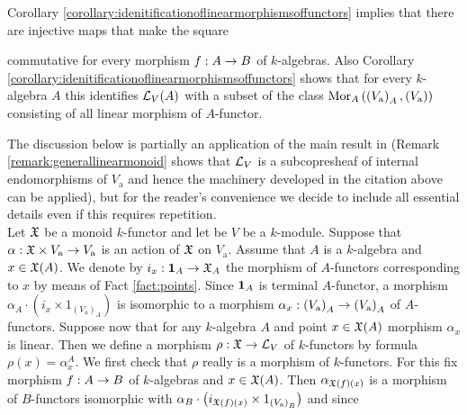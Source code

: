 \begin{remark}\label{remark:generallinearmonoid}
Corollary \ref{corollary:idenitificationoflinearmorphismsoffunctors} implies that there are injective maps that make the square
\begin{center}
\end{center}
commutative for every morphism $f:A\rightarrow B$ of $k$-algebras. Also Corollary \ref{corollary:idenitificationoflinearmorphismsoffunctors} shows that for every $k$-algebra $A$ this identifies ${\mathcal L}_V(A)$ with a subset of the class $\mathrm{Mor}_A\left(\left(V_{\mathrm{a}}\right)_A,\left(V_{\mathrm{a}}\right)\right)$ consisting of all linear morphism of $A$-functor.
\end{remark}
\noindent
The discussion below is partially an application of the main result in {\cite[section 6]{Presheaves}} (Remark \ref{remark:generallinearmonoid} shows that ${\mathcal L}_V$ is a subcopresheaf of internal endomorphisms of $V_{\mathrm{a}}$ and hence the machinery developed in the citation above can be applied), but for the reader's convenience we decide to include all essential details even if this requires repetition.\\
Let ${\mathfrak X}$ be a monoid $k$-functor and let be $V$ be a $k$-module. Suppose that $\alpha:{\mathfrak X}\times V_{\mathrm{a}}\rightarrow V_{\mathrm{a}}$ is an action of ${\mathfrak X}$ on $V_{\mathrm{a}}$. Assume that $A$ is a $k$-algebra and $x\in {\mathfrak X}(A)$. We denote by $i_x:\mathbf{1}_A\rightarrow {\mathfrak X}_A$ the morphism of $A$-functors corresponding to $x$ by means of Fact \ref{fact:points}. Since $\mathbf{1}_A$ is terminal $A$-functor, a morphism $\alpha_A\cdot \left(i_x \times 1_{\left(V_{\mathrm{a}}\right)_A}\right)$ is isomorphic to a morphism $\alpha_x:\left(V_{\mathrm{a}}\right)_A\rightarrow \left(V_{\mathrm{a}}\right)_A$ of $A$-functors. Suppose now that for any $k$-algebra $A$ and point $x\in {\mathfrak X}(A)$ morphism $\alpha_x$ is linear. Then we define a morphism $\rho:{\mathfrak X}\rightarrow {\mathcal L}_V$ of $k$-functors by formula $\rho(x) = \alpha_x^A$. We first check that $\rho$ really is a morphism of $k$-functors. For this fix morphism $f:A\rightarrow B$ of $k$-algebras and $x\in {\mathfrak X}(A)$. Then $\alpha_{{\mathfrak X}(f)(x)}$ is a morphism of $B$-functors isomorphic with $\alpha_B\cdot \left(i_{{\mathfrak X}(f)(x)}\times 1_{\left(V_{\mathrm{a}}\right)_B}\right)$ and since 

